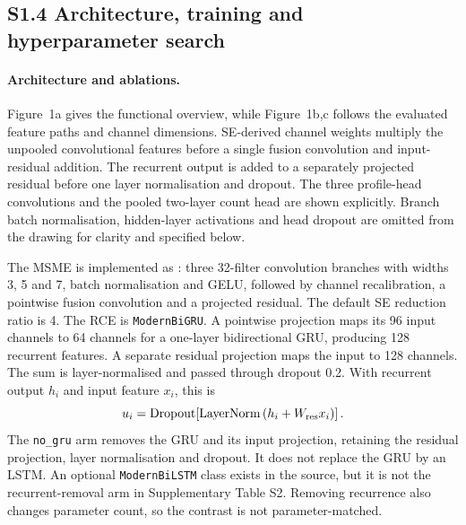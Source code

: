 \documentclass[11pt]{article}
\begin{document}
\subsection*{S1.4 Architecture, training and hyperparameter search}

\paragraph{Architecture and ablations.} Figure~1a gives the functional overview, while Figure~1b,c follows the evaluated feature paths and channel dimensions. SE-derived channel weights multiply the unpooled convolutional features before a single fusion convolution and input-residual addition. The recurrent output is added to a separately projected residual before one layer normalisation and dropout. The three profile-head convolutions and the pooled two-layer count head are shown explicitly. Branch batch normalisation, hidden-layer activations and head dropout are omitted from the drawing for clarity and specified below.

The MSME is implemented as : three 32-filter convolution branches with widths 3, 5 and 7, batch normalisation and GELU, followed by channel recalibration, a pointwise fusion convolution and a projected residual. The default SE reduction ratio is 4. The RCE is \texttt{ModernBiGRU}. A pointwise projection maps its 96 input channels to 64 channels for a one-layer bidirectional GRU, producing 128 recurrent features. A separate residual projection maps the input to 128 channels. The sum is layer-normalised and passed through dropout 0.2. With recurrent output $h_i$ and input feature $x_i$, this is
\begin{equation}
u_i=\mathrm{Dropout}\!\left[\mathrm{LayerNorm}\left(h_i+W_{\rm res}x_i\right)\right].
\end{equation}
The \texttt{no\_gru} arm removes the GRU and its input projection, retaining the residual projection, layer normalisation and dropout. It does not replace the GRU by an LSTM. An optional \texttt{ModernBiLSTM} class exists in the source, but it is not the recurrent-removal arm in Supplementary Table S2. Removing recurrence also changes parameter count, so the contrast is not parameter-matched.
\end{document}
